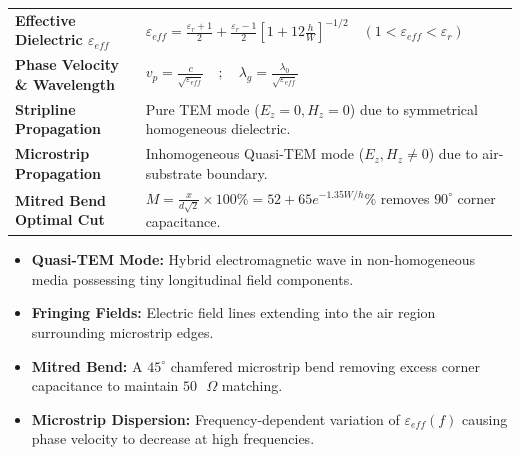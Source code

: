 \documentclass[12pt,a4paper]{article}
\renewcommand{\arraystretch}{1.45}
\begin{document}
\begin{tcolorbox}[formulabox, title={\textbf{Key Concepts and Metrics at a Glance}}]
\renewcommand{\arraystretch}{1.35}
\begin{tabularx}{\linewidth}{>{\raggedright\arraybackslash\bfseries}p{4.5cm} X}
Effective Dielectric $\varepsilon_{eff}$ & $\varepsilon_{eff} = \frac{\varepsilon_r+1}{2} + \frac{\varepsilon_r-1}{2} \left[1 + 12\frac{h}{W}\right]^{-1/2} \quad (1 < \varepsilon_{eff} < \varepsilon_r)$ \\[4pt]
Phase Velocity \& Wavelength & $v_p = \frac{c}{\sqrt{\varepsilon_{eff}}} \quad ; \quad \lambda_g = \frac{\lambda_0}{\sqrt{\varepsilon_{eff}}}$ \\[4pt]
Stripline Propagation & Pure TEM mode ($E_z=0, H_z=0$) due to symmetrical homogeneous dielectric. \\[4pt]
Microstrip Propagation & Inhomogeneous Quasi-TEM mode ($E_z, H_z \ne 0$) due to air-substrate boundary. \\[4pt]
Mitred Bend Optimal Cut & $M = \frac{x}{d\sqrt{2}} \times 100\% = 52 + 65 e^{-1.35 W/h}\%$ removes $90^\circ$ corner capacitance. \\
\end{tabularx}
\end{tcolorbox}

\begin{tcolorbox}[defbox, title={\textbf{One-Line Definitions}}]
  \begin{itemize}[leftmargin=*, noitemsep]
    \item \textbf{Quasi-TEM Mode:} Hybrid electromagnetic wave in non-homogeneous media possessing tiny longitudinal field components.
    \item \textbf{Fringing Fields:} Electric field lines extending into the air region surrounding microstrip edges.
    \item \textbf{Mitred Bend:} A $45^\circ$ chamfered microstrip bend removing excess corner capacitance to maintain $50\text{ }\Omega$ matching.
    \item \textbf{Microstrip Dispersion:} Frequency-dependent variation of $\varepsilon_{eff}(f)$ causing phase velocity to decrease at high frequencies.
  \end{itemize}
\end{tcolorbox}
\end{document}
